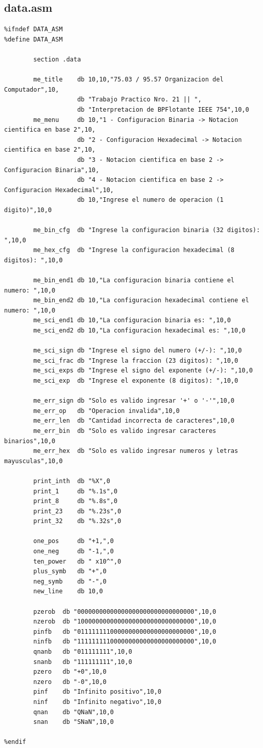 \documentclass{article}
\begin{document}
	\subsection{data.asm}
	\begin{verbatim}
%ifndef DATA_ASM
%define DATA_ASM

        section .data

        me_title    db 10,10,"75.03 / 95.57 Organizacion del Computador",10,
                    db "Trabajo Practico Nro. 21 || ",
                    db "Interpretacion de BPFlotante IEEE 754",10,0
        me_menu     db 10,"1 - Configuracion Binaria -> Notacion cientifica en base 2",10,
                    db "2 - Configuracion Hexadecimal -> Notacion cientifica en base 2",10,
                    db "3 - Notacion cientifica en base 2 -> Configuracion Binaria",10,
                    db "4 - Notacion cientifica en base 2 -> Configuracion Hexadecimal",10,
                    db 10,"Ingrese el numero de operacion (1 digito)",10,0

        me_bin_cfg  db "Ingrese la configuracion binaria (32 digitos): ",10,0
        me_hex_cfg  db "Ingrese la configuracion hexadecimal (8 digitos): ",10,0

        me_bin_end1 db 10,"La configuracion binaria contiene el numero: ",10,0
        me_bin_end2 db 10,"La configuracion hexadecimal contiene el numero: ",10,0
        me_sci_end1 db 10,"La configuracion binaria es: ",10,0
        me_sci_end2 db 10,"La configuracion hexadecimal es: ",10,0

        me_sci_sign db "Ingrese el signo del numero (+/-): ",10,0
        me_sci_frac db "Ingrese la fraccion (23 di­gitos): ",10,0
        me_sci_exps db "Ingrese el signo del exponente (+/-): ",10,0
        me_sci_exp  db "Ingrese el exponente (8 di­gitos): ",10,0

        me_err_sign db "Solo es valido ingresar '+' o '-'",10,0
        me_err_op   db "Operacion invalida",10,0
        me_err_len  db "Cantidad incorrecta de caracteres",10,0
        me_err_bin  db "Solo es valido ingresar caracteres binarios",10,0
        me_err_hex  db "Solo es valido ingresar numeros y letras mayusculas",10,0

        print_inth  db "%X",0
        print_1     db "%.1s",0
        print_8     db "%.8s",0
        print_23    db "%.23s",0
        print_32    db "%.32s",0

        one_pos     db "+1,",0
        one_neg     db "-1,",0
        ten_power   db " x10^",0
        plus_symb   db "+",0
        neg_symb    db "-",0
        new_line    db 10,0

        pzerob  db "00000000000000000000000000000000",10,0
        nzerob  db "10000000000000000000000000000000",10,0
        pinfb   db "01111111100000000000000000000000",10,0
        ninfb   db "11111111100000000000000000000000",10,0
        qnanb   db "011111111",10,0
        snanb   db "111111111",10,0
        pzero   db "+0",10,0
        nzero   db "-0",10,0
        pinf    db "Infinito positivo",10,0
        ninf    db "Infinito negativo",10,0
        qnan    db "QNaN",10,0
        snan    db "SNaN",10,0

%endif

	\end{verbatim}
	
\end{document}
